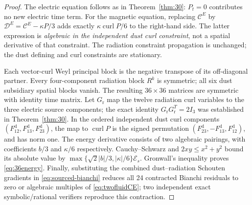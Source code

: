 \documentclass[11pt,a4paper]{article}
\begin{document}
\begin{proof}
The electric equation follows
as in Theorem~\ref{thm:30}:
$P_t=0$ contributes no new
electric time term. For the
magnetic equation, replacing
$\mathcal C^E$ by
$\mathcal D^E=\mathcal C^E-\kappa
P/3$ adds exactly
$\kappa\operatorname{curl}P/6$
to the right-hand side.
The latter expression is
\emph{algebraic in the
independent dust curl
constraint}, not a spatial
derivative of that constraint.
The radiation constraint
propagation is unchanged;
the dust defining and curl
constraints are stationary.

Each vector-curl Weyl
principal block is the
negative transpose of its
off-diagonal partner.
Every four-component radiation
block $R^k$ is symmetric;
all six dust subsidiary
spatial blocks vanish.
The resulting
$36\times36$ matrices are
symmetric with identity
time matrix.
Let $G_{\mathrm r}$ map the
twelve radiation curl variables
to the three electric source
components; the exact identity
$G_{\mathrm r}G_{\mathrm r}^{T}
=2I_3$ was established in
Theorem~\ref{thm:30}.
In the ordered independent
dust curl components
$(F^{\mathrm d}_{12},
F^{\mathrm d}_{13},
F^{\mathrm d}_{23})$,
the map to $\operatorname{curl}P$
is the signed permutation
$(F_{23}^{\mathrm d},
-F_{13}^{\mathrm d},
F_{12}^{\mathrm d})$,
and has norm one.
The energy derivative consists
of two algebraic pairings,
with coefficients $b/3$
and $\kappa/6$ respectively.
Cauchy--Schwarz and
$2xy\le x^2+y^2$ bound its
absolute value by
$\max\{\sqrt2|b|/3,|\kappa|/6\}
\mathcal E_s$.
Gronwall's inequality proves
\eqref{eq:36energy}.
Finally, substituting the
combined dust--radiation
Schouten gradients in
\eqref{eq:sourced-bianchi}
reduces all 24 contracted
Bianchi residuals to zero
or algebraic multiples of
\eqref{eq:twofluidCE};
two independent exact
symbolic/rational verifiers
reproduce this contraction.
\end{proof}
\end{document}
